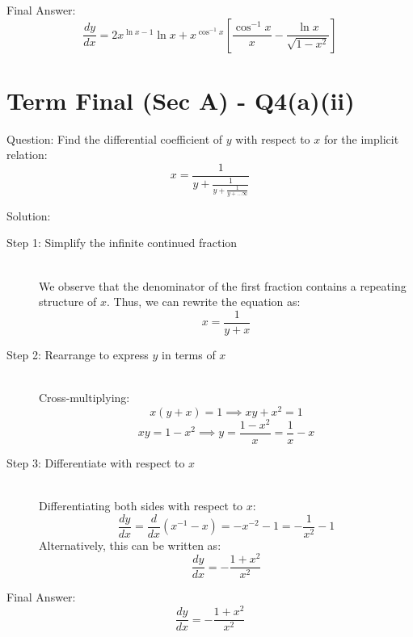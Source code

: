 \documentclass[11pt, a4paper]{article}
\begin{document}
Final Answer:
\[ 
\boxed{\frac{dy}{dx} = 2x^{\ln x - 1} \ln x + x^{\cos^{-1}x} \left[ \frac{\cos^{-1}x}{x} - \frac{\ln x}{\sqrt{1-x^2}} \right]} 
\]



\section*{Term Final (Sec A) - Q4(a)(ii)}

Question:
Find the differential coefficient of $y$ with respect to $x$ for the implicit relation:
\[ x = \frac{1}{y + \frac{1}{y + \frac{1}{y + \dots \infty}}} \]

Solution:

\begin{description}
    \item[Step 1: Simplify the infinite continued fraction] \ \\
    We observe that the denominator of the first fraction contains a repeating structure of $x$. Thus, we can rewrite the equation as:
    \[ x = \frac{1}{y + x} \]

    \item[Step 2: Rearrange to express $y$ in terms of $x$] \ \\
    Cross-multiplying:
    \[ x(y + x) = 1 \implies xy + x^2 = 1 \]
    \[ xy = 1 - x^2 \implies y = \frac{1 - x^2}{x} = \frac{1}{x} - x \]

    \item[Step 3: Differentiate with respect to $x$] \ \\
    Differentiating both sides with respect to $x$:
    \[ \frac{dy}{dx} = \frac{d}{dx}\left(x^{-1} - x\right) = -x^{-2} - 1 = -\frac{1}{x^2} - 1 \]
    Alternatively, this can be written as:
    \[ \frac{dy}{dx} = -\frac{1+x^2}{x^2} \]
\end{description}

Final Answer:
\[ 
\boxed{\frac{dy}{dx} = -\frac{1+x^2}{x^2}} 
\]
\end{document}
